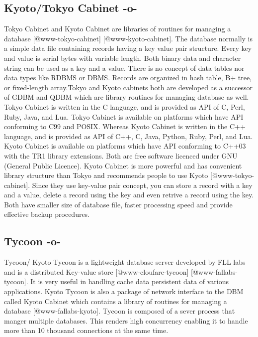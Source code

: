 \subsection{Kyoto/Tokyo Cabinet -o-}

Tokyo Cabinet and Kyoto Cabinet are libraries of routines for managing
a database [@www-tokyo-cabinet] [@www-kyoto-cabinet].  The
database normally is a simple data file containing records having a
key value pair structure. Every key and value is serial bytes with
variable length. Both binary data and character string can be used as
a key and a value. There is no concept of data tables nor data types
like RDBMS or DBMS. Records are organized in hash table, B+ tree, or
fixed-length array.Tokyo and Kyoto cabinets both are developed as a
successor of GDBM and QDBM which are library routines for managing
database as well. Tokyo Cabinet is written in the C language, and is
provided as API of C, Perl, Ruby, Java, and Lua. Tokyo Cabinet is
available on platforms which have API conforming to C99 and
POSIX. Whereas Kyoto Cabinet is written in the C++ language, and is
provided as API of C++, C, Java, Python, Ruby, Perl, and Lua. Kyoto
Cabinet is available on platforms which have API conforming to C++03
with the TR1 library extensions. Both are free software licenced under
GNU (General Public Licence). Kyoto Cabinet is more powerful and has
convenient library structure than Tokyo and recommends people to use
Kyoto [@www-tokyo-cabinet]. Since they use key-value pair
concept, you can store a record with a key and a value, delete a
record using the key and even retrive a record using the key. Both
have smaller size of database file, faster processing speed and
provide effective backup procedures.



     
\subsection{Tycoon -o-}

Tycoon/ Kyoto Tycoon is a lightweight database server developed by FLL
labs and is a distributed Key-value
store [@www-cloufare-tycoon] [@www-fallabs-tycoon].  It is
very useful in handling cache data persistent data of various
applications. Kyoto Tycoon is also a package of network interface to
the DBM called Kyoto Cabinet which contains a library of routines for
managing a database [@www-fallabs-kyoto]. Tycoon is composed of a
sever process that manger multiple databases. This renders high
concurrency enabling it to handle more than 10 thousand connections at
the same time.


